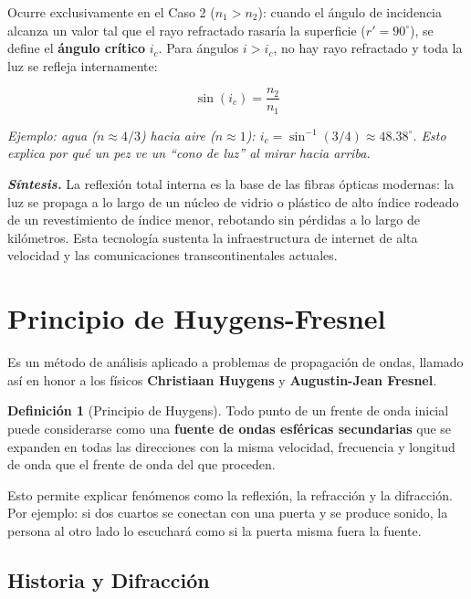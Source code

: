 \documentclass[12pt, a4paper]{article}
\theoremstyle{definition}
\newtheorem{definicion}{Definición}[section]
\newcommand{\nota}[1]{\medskip\noindent\colorbox{grisclaro}{\parbox{0.95\linewidth}{\textit{#1}}}\medskip}
\begin{document}
Ocurre exclusivamente en el Caso 2 (\(n_1 > n_2\)): cuando el ángulo de incidencia alcanza un
valor tal que el rayo refractado rasaría la superficie (\(r' = 90^{\circ}\)), se define el
\textbf{ángulo crítico} \(i_c\). Para ángulos \(i > i_c\), no hay rayo refractado y toda la
luz se refleja internamente:

\begin{equation}
  \sin(i_c) = \frac{n_2}{n_1}
  \label{eq:angulo_critico}
\end{equation}

\nota{Ejemplo: agua (\(n \approx 4/3\)) hacia aire (\(n \approx 1\)):
\(i_c = \sin^{-1}(3/4) \approx 48.38^{\circ}\). Esto explica por qué un pez ve un ``cono de luz''
al mirar hacia arriba.}

\textit{\textbf{Síntesis.}} La reflexión total interna es la base de las fibras ópticas
modernas: la luz se propaga a lo largo de un núcleo de vidrio o plástico de alto índice
rodeado de un revestimiento de índice menor, rebotando sin pérdidas a lo largo de kilómetros.
Esta tecnología sustenta la infraestructura de internet de alta velocidad y las comunicaciones
transcontinentales actuales.

\section{Principio de Huygens-Fresnel}
\label{sec:huygens}

Es un método de análisis aplicado a problemas de propagación de ondas, llamado así en honor a
los físicos \textbf{Christiaan Huygens} y \textbf{Augustin-Jean Fresnel}.

\begin{definicion}[Principio de Huygens]
Todo punto de un frente de onda inicial puede considerarse como una \textbf{fuente de ondas
esféricas secundarias} que se expanden en todas las direcciones con la misma velocidad,
frecuencia y longitud de onda que el frente de onda del que proceden.
\end{definicion}

Esto permite explicar fenómenos como la reflexión, la refracción y la difracción. Por ejemplo:
si dos cuartos se conectan con una puerta y se produce sonido, la persona al otro lado lo
escuchará como si la puerta misma fuera la fuente.

\subsection{Historia y Difracción}
\end{document}
